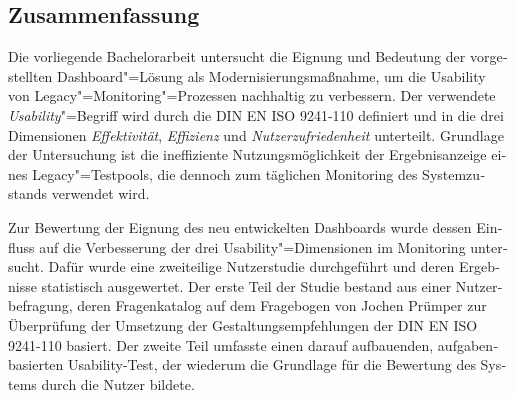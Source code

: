 \begin{otherlanguage}{ngerman}
	\chapter*{Zusammenfassung}

    

    Die vorliegende Bachelorarbeit untersucht die Eignung und Bedeutung der vorgestellten Dash\-board"=Lösung als Modernisierungsmaßnahme, um die Usability von Legacy"=Monitoring"=Prozessen nachhaltig zu verbessern. Der verwendete \textit{Usability}"=Begriff wird durch die DIN EN ISO 9241-110 definiert und in die drei Dimensionen \textit{Effektivität}, \textit{Effizienz} und \textit{Nutzerzufriedenheit} unterteilt. Grundlage der Untersuchung ist die ineffiziente Nutzungsmöglichkeit der Ergebnisanzeige eines Legacy"=Testpools, die dennoch zum täglichen Monitoring des Systemzustands verwendet wird.



    
    Zur Bewertung der Eignung des neu entwickelten Dash\-boards wurde dessen Einfluss auf die Verbesserung der drei Usability"=Dimensionen im Monitoring untersucht. Dafür wurde eine zweiteilige Nutzerstudie durchgeführt und deren Ergebnisse statistisch ausgewertet. Der erste Teil der Studie bestand aus einer Nutzerbefragung, deren Fragenkatalog auf dem Fragebogen von Jochen Prümper zur Überprüfung der Umsetzung der Gestaltungsempfehlungen der DIN EN ISO 9241-110 basiert. Der zweite Teil umfasste einen darauf aufbauenden, aufgabenbasierten Usability-Test, der wiederum die Grundlage für die Bewertung des Systems durch die Nutzer bildete.
    

\end{otherlanguage}
